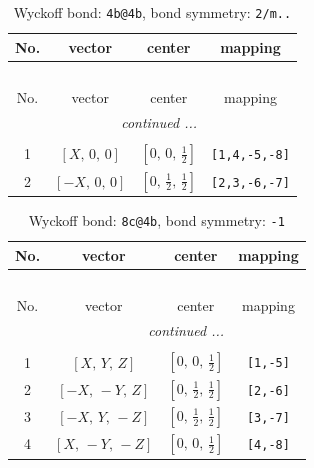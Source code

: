 \documentclass[fleqn,8pt]{jsarticle}
\begin{document}
\renewcommand{\arraystretch}{1.2}
\begin{longtable}{cccc}
\caption{Wyckoff bond: {\tt 4b@4b}, bond symmetry: {\tt 2/m..}}
 \\
 \hline \hline
No. & vector & center & mapping \\ \hline \endfirsthead

\multicolumn{3}{l}{\tablename\ \thetable{}} \\
 \hline \hline
No. & vector & center & mapping \\ \hline \endhead

 \hline \hline
\multicolumn{3}{r}{\footnotesize\it continued ...} \\ \endfoot

 \hline \hline
\multicolumn{3}{r}{} \\ \endlastfoot

1 & $\left[ X,\, 0,\, 0 \right]$ & $\left[ 0,\, 0,\, \frac{1}{2} \right]$ & {\tt [1,4,-5,-8]} \\ \hline
2 & $\left[ - X,\, 0,\, 0 \right]$ & $\left[ 0,\, \frac{1}{2},\, \frac{1}{2} \right]$ & {\tt [2,3,-6,-7]} \\
\end{longtable}
\renewcommand{\arraystretch}{1.2}
\begin{longtable}{cccc}
\caption{Wyckoff bond: {\tt 8c@4b}, bond symmetry: {\tt -1}}
 \\
 \hline \hline
No. & vector & center & mapping \\ \hline \endfirsthead

\multicolumn{3}{l}{\tablename\ \thetable{}} \\
 \hline \hline
No. & vector & center & mapping \\ \hline \endhead

 \hline \hline
\multicolumn{3}{r}{\footnotesize\it continued ...} \\ \endfoot

 \hline \hline
\multicolumn{3}{r}{} \\ \endlastfoot

1 & $\left[ X,\, Y,\, Z \right]$ & $\left[ 0,\, 0,\, \frac{1}{2} \right]$ & {\tt [1,-5]} \\ \hline
2 & $\left[ - X,\, - Y,\, Z \right]$ & $\left[ 0,\, \frac{1}{2},\, \frac{1}{2} \right]$ & {\tt [2,-6]} \\ \hline
3 & $\left[ - X,\, Y,\, - Z \right]$ & $\left[ 0,\, \frac{1}{2},\, \frac{1}{2} \right]$ & {\tt [3,-7]} \\ \hline
4 & $\left[ X,\, - Y,\, - Z \right]$ & $\left[ 0,\, 0,\, \frac{1}{2} \right]$ & {\tt [4,-8]} \\
\end{longtable}
\end{document}
